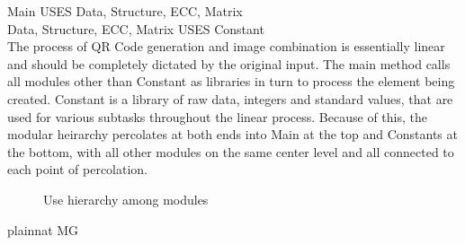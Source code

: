 \documentclass[12pt, titlepage]{article}
\begin{document}
Main USES Data, Structure, ECC, Matrix\\
Data, Structure, ECC, Matrix USES Constant\\

The process of QR Code generation and image combination is essentially linear 
and should be completely dictated by the original input. The main method calls 
all modules other than Constant as libraries in turn to process the element being
created. Constant is a library of raw data, integers and standard values, that 
are used for various subtasks throughout the linear process. Because of this, the 
modular heirarchy percolates at both ends into Main at the top and Constants at 
the bottom, with all other modules on the same center level and all connected 
to each point of percolation.

\begin{figure}[H]
\centering
\caption{Use hierarchy among modules}
\label{FigUH}
\end{figure}


 {plainnat}
 {MG}
\end{document}
